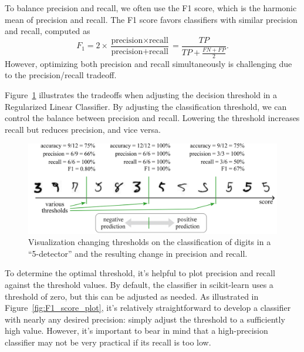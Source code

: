 \documentclass[12pt,letter]{article}
\begin{document}
To balance precision and recall, we often use the F1 score, which is the harmonic mean of precision and recall. The F1 score favors classifiers with similar precision and recall, computed as
\begin{equation}
F_1 = 2 \times \frac { \text{precision} \times \text{recall}}{\text{precision} + \text{recall}} = \frac{TP}{TP + \frac{FN + FP}{2}}.
\end{equation}
However, optimizing both precision and recall simultaneously is challenging due to the precision/recall tradeoff. 

Figure~\ref{fig:decision_threshold} illustrates the tradeoffs when adjusting the decision threshold in a Regularized Linear Classifier. By adjusting the classification threshold, we can control the balance between precision and recall. Lowering the threshold increases recall but reduces precision, and vice versa. 


\begin{figure}[H]
    \centering
    \includegraphics[]{../figures/decision_threshold.png}
    \caption{Visualization changing thresholds on the classification of digits in a ``5-detector'' and the resulting change in precision and recall.}
    \label{fig:decision_threshold}
\end{figure}

To determine the optimal threshold, it's helpful to plot precision and recall against the threshold values. By default, the classifier in scikit-learn uses a threshold of zero, but this can be adjusted as needed. As illustrated in Figure~\ref{fig:F1_score_plot}, it's relatively straightforward to develop a classifier with nearly any desired precision: simply adjust the threshold to a sufficiently high value. However, it's important to bear in mind that a high-precision classifier may not be very practical if its recall is too low. 
\end{document}
